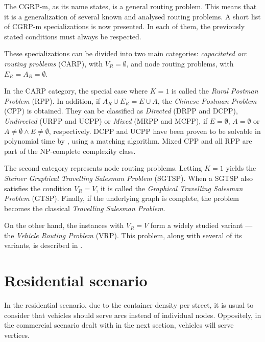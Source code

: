 The CGRP-m, as its name states, is a general routing problem. This means that
it is a generalization of several known and analysed routing problems. A short
list of CGRP-m specializations is now presented. In each of them, the
previously stated conditions must always be respected.

These specializations can be divided into two main categories:
\textit{capacitated arc routing problems} (CARP), with $V_R = \emptyset$, and
node routing problems, with $E_R = A_R = \emptyset$.

In the CARP category, the special case where $K = 1$ is called the
\textit{Rural Postman Problem} (RPP). In addition, if $A_R \cup E_R = E \cup
A$, the \textit{Chinese Postman Problem} (CPP) is obtained\citep{Pandit95}.
They can be classified as \textit{Directed} (DRPP and DCPP),
\textit{Undirected} (URPP and UCPP) or \textit{Mixed} (MRPP and MCPP), if $E =
\emptyset$, $A = \emptyset$ or $A \neq \emptyset \wedge E \neq \emptyset$,
respectively. DCPP and UCPP have been proven to be solvable in polynomial time
by \citet{Edmonds73}, using a matching algorithm. Mixed CPP and all RPP are
part of the NP-complete complexity
class\citep{Pandit95}.

The second category represents node routing problems. Letting $K = 1$ yields
the \textit{Steiner Graphical Travelling Salesman Problem}
(SGTSP)\citep{Letchford99}. When a SGTSP also satisfies the condition $V_R =
V$, it is called the \textit{Graphical Travelling Salesman Problem} (GTSP).
Finally, if the underlying graph is complete, the problem becomes the classical
\textit{Travelling Salesman Problem}.

On the other hand, the instances with $V_R = V$ form a widely studied variant
--- the \textit{Vehicle Routing Problem} (VRP). This problem, along with
several of its variants, is described in \citet{Toth01book}.







\section{Residential scenario}
\label{section:residential}

In the residential scenario, due to the container density per street, it is
usual to consider that vehicles should serve arcs instead of individual nodes.
Oppositely, in the commercial scenario dealt with in the next section, vehicles
will serve vertices.



